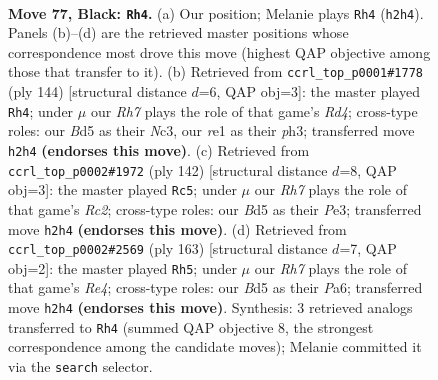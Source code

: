 \documentclass[11pt]{article}
\begin{document}
\clearpage

\begin{figure}[p]\centering
\begin{subfigure}{0.46\textwidth}\centering
\resizebox{\linewidth}{!}{%
\newchessgame
\chessboard[
  setfen={1R6/3k4/8/3b4/1P6/3K4/7r/4R3 b - - 28 77},
  showmover=false,
  pgfstyle=straightmove, color=movearrow, markmove={h2-h4}
]}
\caption{}
\end{subfigure}\hfill
\begin{subfigure}{0.46\textwidth}\centering
\resizebox{\linewidth}{!}{%
\newchessgame
\chessboard[
  setfen={2k5/p7/8/8/3R4/2N4p/5K2/r7 w - - 2 73},
  showmover=false,
  pgfstyle=straightmove, color=movearrow, markmove={d4-h4}
]}
\caption{}
\end{subfigure}
\\[4pt]
\begin{subfigure}{0.46\textwidth}\centering
\resizebox{\linewidth}{!}{%
\newchessgame
\chessboard[
  setfen={8/3k4/8/p3K3/8/4P3/2R5/r7 w - - 3 72},
  showmover=false,
  pgfstyle=straightmove, color=movearrow, markmove={c2-c5}
]}
\caption{}
\end{subfigure}\hfill
\begin{subfigure}{0.46\textwidth}\centering
\resizebox{\linewidth}{!}{%
\newchessgame
\chessboard[
  setfen={8/6RP/p1k5/4r3/8/5K2/8/8 b - - 4 82},
  showmover=false,
  pgfstyle=straightmove, color=movearrow, markmove={e5-h5}
]}
\caption{}
\end{subfigure}
\caption{\textbf{Move 77, Black: \texttt{Rh4}.} (a) Our position; Melanie plays \texttt{Rh4} (\texttt{h2h4}). Panels (b)--(d) are the retrieved master positions whose correspondence most drove this move (highest QAP objective among those that transfer to it). (b) Retrieved from \texttt{ccrl\_top\_p0001\#1778} (ply 144) [structural distance $d$=6, QAP obj=3]: the master played \texttt{Rh4}; under $\mu$ our \emph{Rh7} plays the role of that game's \emph{Rd4}; cross-type roles: our \emph{B}d5 as their \emph{N}c3, our \emph{r}e1 as their \emph{p}h3; transferred move \texttt{h2h4} \textbf{(endorses this move)}. (c) Retrieved from \texttt{ccrl\_top\_p0002\#1972} (ply 142) [structural distance $d$=8, QAP obj=3]: the master played \texttt{Rc5}; under $\mu$ our \emph{Rh7} plays the role of that game's \emph{Rc2}; cross-type roles: our \emph{B}d5 as their \emph{P}e3; transferred move \texttt{h2h4} \textbf{(endorses this move)}. (d) Retrieved from \texttt{ccrl\_top\_p0002\#2569} (ply 163) [structural distance $d$=7, QAP obj=2]: the master played \texttt{Rh5}; under $\mu$ our \emph{Rh7} plays the role of that game's \emph{Re4}; cross-type roles: our \emph{B}d5 as their \emph{P}a6; transferred move \texttt{h2h4} \textbf{(endorses this move)}. Synthesis: 3 retrieved analogs transferred to \texttt{Rh4} (summed QAP objective 8, the strongest correspondence among the candidate moves); Melanie committed it via the \texttt{search} selector.}
\label{fig:thought-m153}
\end{figure}
\end{document}
